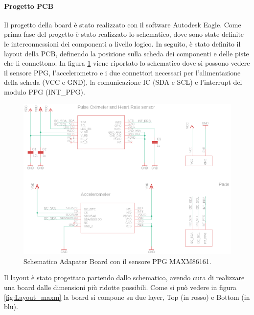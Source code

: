 \paragraph{Progetto PCB} Il progetto della board è stato realizzato con il software Autodesk Eagle. Come prima fase del progetto è stato realizzato lo schematico, dove sono state definite le interconnessioni dei componenti a livello logico. In seguito, è stato definito il layout della PCB, definendo la posizione sulla scheda dei componenti e delle piste che li connettono.
In figura \ref{fig:schematic_maxm} viene riportato lo schematico dove si possono vedere il sensore PPG, l'accelerometro e i due connettori necessari per l'alimentazione della scheda (VCC e GND), la comunicazione IC (SDA e SCL) e l'interrupt del modulo PPG (INT\_PPG).
\begin{figure}[b]
	\centering
	\includegraphics[width=0.8\linewidth]{ImageFiles/Hardware/schematic_maxm}
	\caption{Schematico Adapater Board con il sensore PPG MAXM86161.}
	\label{fig:schematic_maxm}
\end{figure}
Il layout è stato progettato partendo dallo schematico, avendo cura di realizzare una board dalle dimensioni più ridotte possibili. Come si può vedere in figura \ref{fig:Layout_maxm} la board si compone su due layer, Top (in rosso) e Bottom (in blu).
